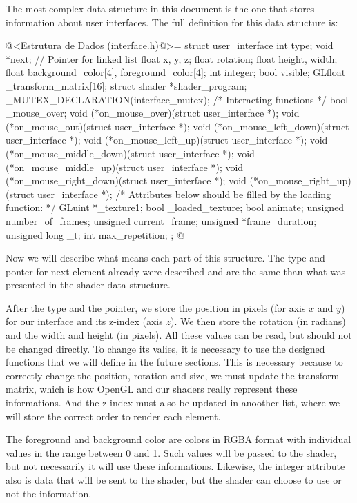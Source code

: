 
The most complex data structure in this document is the one that
stores information about user interfaces. The full definition for this
data structure is:

\iniciocodigo
@<Estrutura de Dados (interface.h)@>=
struct user_interface{
  int type;
  void *next; // Pointer for linked list
  float x, y, z;
  float rotation;
  float height, width;
  float background_color[4], foreground_color[4];
  int integer;
  bool visible;
  GLfloat _transform_matrix[16];
  struct shader *shader_program;
  _MUTEX_DECLARATION(interface_mutex);
  /* Interacting functions */
  bool _mouse_over;
  void (*on_mouse_over)(struct user_interface *);
  void (*on_mouse_out)(struct user_interface *);
  void (*on_mouse_left_down)(struct user_interface *);
  void (*on_mouse_left_up)(struct user_interface *);
  void (*on_mouse_middle_down)(struct user_interface *);
  void (*on_mouse_middle_up)(struct user_interface *);
  void (*on_mouse_right_down)(struct user_interface *);
  void (*on_mouse_right_up)(struct user_interface *);
  /* Attributes below should be filled by the loading function: */
  GLuint *_texture1;
  bool _loaded_texture;
  bool animate;
  unsigned number_of_frames;
  unsigned current_frame;
  unsigned *frame_duration;
  unsigned long _t;
  int max_repetition;
};
@
\fimcodigo

Now we will describe what means each part of this structure. The type
and ponter for next element already were described and are the same
than what was presented in the shader data structure.

After the type and the pointer, we store the position in pixels (for
axis $x$ and $y$) for our interface and its z-index (axis $z$). We
then store the rotation (in radians) and the width and height (in
pixels). All these values can be read, but should not be changed
directly. To change its valies, it is necessary to use the designed
functions that we will define in the future sections. This is
necessary because to correctly change the position, rotation and size,
we must update the transform matrix, which is how OpenGL and our
shaders really represent these informations. And the z-index must also
be updated in anoother list, where we will store the correct order to
render each element.

The foreground and background color are colors in RGBA format with
individual values in the range between 0 and 1. Such values will be
passed to the shader, but not necessarily it will use these
informations. Likewise, the integer attribute also is data that will
be sent to the shader, but the shader can choose to use or not the
information.


